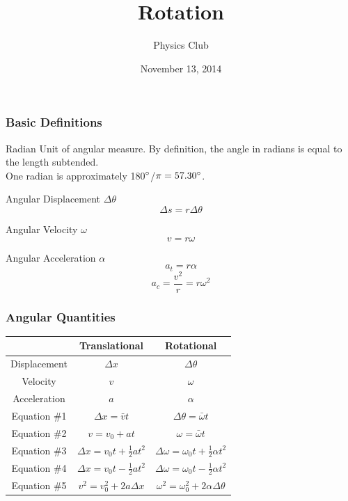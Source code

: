 \documentclass[table,letterpaper]{beamer}
\title{Rotation}
\author{Physics Club}
\date{November 13, 2014}
\begin{document}
\frame{\titlepage}

\begin{frame}
\frametitle{Basic Definitions}
\begin{block}{Radian}
Unit of angular measure. By definition, the angle in radians is equal to the length subtended.\\
One radian is approximately 180$\degree$/$\pi = 57.30\degree$.
\end{block}

\begin{block}{Angular Displacement $\Delta \theta$}
$$\Delta s = r\Delta \theta$$
\end{block}

\begin{block}{Angular Velocity $\omega$}
$$v = r\omega$$
\end{block}

\begin{block}{Angular Acceleration $\alpha$}
$$a_t = r\alpha$$
$$a_c = \frac{v^2}{r} = r\omega^2$$
\end{block}
\end{frame}

\begin{frame}
\frametitle{Angular Quantities}
\renewcommand{\arraystretch}{1.5}
\begin{center}
{\tabulinesep=1.2mm
\begin{tabu}{c | c | c}
& Translational & Rotational\\ \hline
Displacement & $\displaystyle \Delta x$ & $\displaystyle \Delta \theta$\\
Velocity & $\displaystyle v$ & $\displaystyle \omega$\\
Acceleration & $\displaystyle a$ & $\displaystyle \alpha$\\
Equation \#1 & $\displaystyle \Delta x = \bar{v}t$ & $\displaystyle \Delta \theta = \bar{\omega}t$\\
Equation \#2 & $\displaystyle v = v_0 + at$ & $\displaystyle \omega = \bar{\omega}t$\\
Equation \#3 & $\displaystyle \Delta x = v_0t + \frac{1}{2}at^2$ & $\displaystyle \Delta \omega = \omega_0t + \frac{1}{2}\alpha t^2$\\
Equation \#4 & $\displaystyle \Delta x = v_0t - \frac{1}{2}at^2$ & $\displaystyle \Delta \omega = \omega_0t - \frac{1}{2}\alpha t^2$\\
Equation \#5 & $\displaystyle v^2 = v_0^2 + 2a\Delta x$ & $\displaystyle \omega^2 = \omega_0^2 + 2\alpha\Delta\theta$\\
\end{tabu}}
\end{center}
\end{frame}
\end{document}
